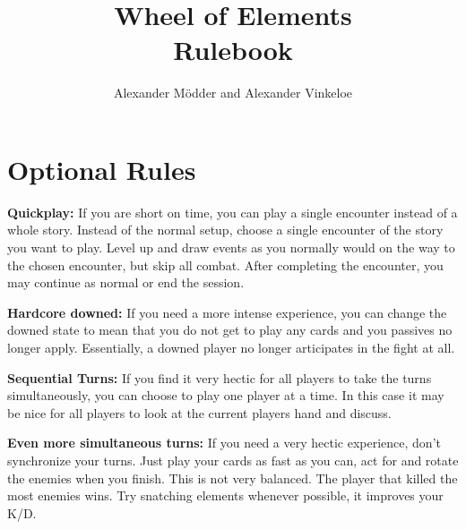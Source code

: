 \documentclass[english,10pt,a4paper]{article}
\title{\textbf {Wheel of Elements} \\Rulebook}
\author{Alexander Mödder and Alexander Vinkeloe}
\begin{document}


\newpage



\newpage



\newpage




\newpage



\newpage

\newpage



\newpage



\newpage



\newpage



\newpage




\newpage

\section{Optional Rules}

\textbf{Quickplay:} If you are short on time, you can play a single encounter instead of a whole story. Instead of the normal setup, choose a single encounter of the story you want to play. Level up and draw events as you normally would on the way to the chosen encounter, but skip all combat. After completing the encounter, you may continue as normal or end the session. %

\textbf{Hardcore downed:} If you need a more intense experience, you can change the downed state to mean that you do not get to play any cards and you passives no longer apply. Essentially, a downed player no longer articipates in the fight at all.

\textbf{Sequential Turns:}  If you find it very hectic for all players to take the turns simultaneously, you can choose to play one player at a time. In this case it may be nice for all players to look at the current players hand and discuss.

\textbf{Even more simultaneous turns:}  If you need a very hectic experience, don't synchronize your turns. Just play your cards as fast as you can, act for and rotate the enemies when you finish. This is not very balanced. The player that killed the most enemies wins. Try snatching elements whenever possible, it improves your K/D.

\newpage



\end{document}
